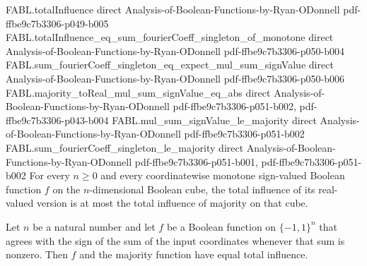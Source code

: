 \begin{theorem}
\proofstep
  {FABL.totalInfluence}
  {direct}
  {Analysis-of-Boolean-Functions-by-Ryan-ODonnell}
  {pdf-ffbe9c7b3306-p049-b005}
\proofstep
  {FABL.totalInfluence_eq_sum_fourierCoeff_singleton_of_monotone}
  {direct}
  {Analysis-of-Boolean-Functions-by-Ryan-ODonnell}
  {pdf-ffbe9c7b3306-p050-b004}
\proofstep
  {FABL.sum_fourierCoeff_singleton_eq_expect_mul_sum_signValue}
  {direct}
  {Analysis-of-Boolean-Functions-by-Ryan-ODonnell}
  {pdf-ffbe9c7b3306-p050-b006}
\proofstep
  {FABL.majority_toReal_mul_sum_signValue_eq_abs}
  {direct}
  {Analysis-of-Boolean-Functions-by-Ryan-ODonnell}
  {pdf-ffbe9c7b3306-p051-b002,
    pdf-ffbe9c7b3306-p043-b004}
\proofstep
  {FABL.mul_sum_signValue_le_majority}
  {direct}
  {Analysis-of-Boolean-Functions-by-Ryan-ODonnell}
  {pdf-ffbe9c7b3306-p051-b002}
\proofstep
  {FABL.sum_fourierCoeff_singleton_le_majority}
  {direct}
  {Analysis-of-Boolean-Functions-by-Ryan-ODonnell}
  {pdf-ffbe9c7b3306-p051-b001,
    pdf-ffbe9c7b3306-p051-b002}
For every $n\ge 0$ and every coordinatewise monotone sign-valued Boolean function $f$ on
the $n$-dimensional Boolean cube, the total influence of its real-valued version is at
most the total influence of majority on that cube.
\end{theorem}

\begin{theorem}
\label{FABL.totalInfluence_eq_majority_of_isMajorityFunction}
\leanok
{}
Let $n$ be a natural number and let $f$ be a Boolean function on $\{-1,1\}^n$ that
agrees with the sign of the sum of the input coordinates whenever that sum is nonzero.
Then $f$ and the majority function have equal total influence.
\end{theorem}
